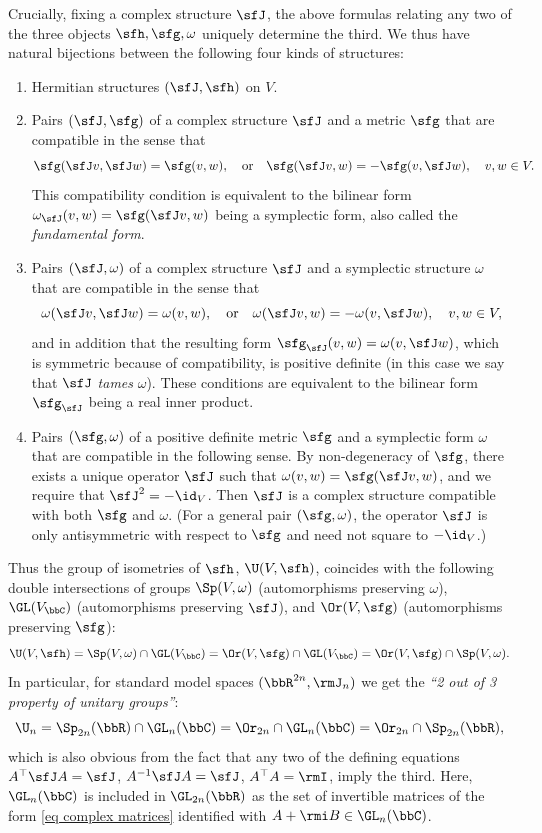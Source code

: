 \begin{example}
    Crucially, fixing a complex structure $\sfJ$, the above formulas relating any two of the three objects $\sfh,\sfg,\omega$ uniquely determine the third. We thus have natural bijections between the following four kinds of structures:
    \begin{enumerate}
        \item Hermitian structures $(\sfJ,\sfh)$ on $V$.
        \item Pairs $(\sfJ,\sfg)$ of a complex structure $\sfJ$ and a metric $\sfg$ that are compatible in the sense that
        \[\sfg(\sfJ v,\sfJ w)=\sfg(v,w),\quad \text{or}\quad \sfg(\sfJ v,w)=-\sfg(v,\sfJ w),\quad v,w\in V.\]
        This compatibility condition is equivalent to the bilinear form $\omega_\sfJ(v,w)=\sfg(\sfJ v,w)$ being a symplectic form, also called the \emph{fundamental form}.
        \item Pairs $(\sfJ,\omega)$ of a complex structure $\sfJ$ and a symplectic structure $\omega$ that are compatible in the sense that
        \[\omega(\sfJ v,\sfJ w)=\omega(v,w),\quad \text{or}\quad \omega(\sfJ v,w)=-\omega(v,\sfJ w),\quad v,w\in V,\]
        and in addition that the resulting form $\sfg_\sfJ(v,w)=\omega(v,\sfJ w)$, which is symmetric because of compatibility, is positive definite (in this case we say that $\sfJ$ \emph{tames} $\omega$). These conditions are equivalent to the bilinear form $\sfg_\sfJ$ being a real inner product.
        \item Pairs $(\sfg,\omega)$ of a positive definite metric $\sfg$ and a symplectic form $\omega$ that are compatible in the following sense. By non-degeneracy of $\sfg$, there exists a unique operator $\sfJ$ such that $\omega(v,w)=\sfg(\sfJ v,w)$, and we require that $\sfJ^2=-\id_V$. Then $\sfJ$ is a complex structure compatible with both $\sfg$ and $\omega$. (For a general pair $(\sfg,\omega)$, the operator $\sfJ$ is only antisymmetric with respect to $\sfg$ and need not square to $-\id_V$.)
    \end{enumerate}
    Thus the group of isometries of $\sfh$, $\U(V,\sfh)$, coincides with the following double intersections of groups $\Sp(V,\omega)$ (automorphisms preserving $\omega$), $\GL(V_\bbC)$ (automorphisms preserving $\sfJ$), and $\Or(V,\sfg)$ (automorphisms preserving $\sfg$):
    \[\U(V,\sfh)=\Sp(V,\omega)\cap \GL(V_\bbC)=\Or(V,\sfg)\cap \GL(V_\bbC)=\Or(V,\sfg)\cap \Sp(V,\omega).\]
    In particular, for standard model spaces $(\bbR^{2n},\rmJ_{n})$ we get the \emph{``2 out of 3 property of unitary groups''}:
    \[\U_n=\Sp_{2n}(\bbR)\cap \GL_n(\bbC)=\Or_{2n}\cap \GL_n(\bbC)=\Or_{2n}\cap \Sp_{2n}(\bbR),\]
    which is also obvious from the fact that any two of the defining equations $A^\top\sfJ A=\sfJ$, $A^{-1}\sfJ A= \sfJ$, $A^\top A=\rmI$, imply the third.
    Here, $\GL_n(\bbC)$ is included in $\GL_{2n}(\bbR)$ as the set of invertible matrices of the form \eqref{eq complex matrices} identified with $A+\rmi B\in \GL_n(\bbC)$.
    

\end{example}

